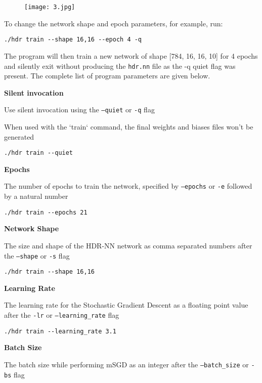 \begin{figure}[h]
	\centering
	\texttt{[image: 3.jpg]}
\end{figure}

To change the network shape and epoch parameters, for example, run:

\begin{verbatim}
./hdr train --shape 16,16 --epoch 4 -q
\end{verbatim}

The program will then train a new network of shape [784, 16, 16, 10] for 4 epochs and silently exit without producing the \texttt{hdr.nn} file as the -q quiet flag was present. The complete list of program parameters are given below.

\textbf{Silent invocation}

Use silent invocation using the \texttt{--quiet} or \texttt{-q} flag

When used with the `train` command, the final weights and biases files won't be generated

\begin{verbatim}
./hdr train --quiet
\end{verbatim}

\textbf{Epochs}

The number of epochs to train the network, specified by \texttt{--epochs} or \texttt{-e} followed by a natural number

\begin{verbatim}
./hdr train --epochs 21
\end{verbatim}

\textbf{Network Shape}

The size and shape of the HDR-NN network as comma separated numbers after the \texttt{--shape} or \texttt{-s} flag

\begin{verbatim}
./hdr train --shape 16,16
\end{verbatim}

\textbf{Learning Rate}

The learning rate for the Stochastic Gradient Descent as a floating point value after the \texttt{-lr} or \texttt{--learning\_rate} flag

\begin{verbatim}
./hdr train --learning_rate 3.1
\end{verbatim}

\textbf{Batch Size}

The batch size while performing mSGD as an integer after the \texttt{--batch\_size} or \texttt{-bs} flag


